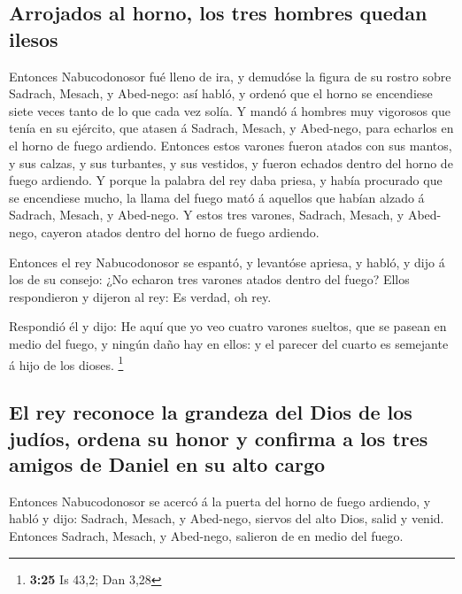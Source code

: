 \hypertarget{arrojados-al-horno-los-tres-hombres-quedan-ilesos}{%
\subsection{Arrojados al horno, los tres hombres quedan
ilesos}\label{arrojados-al-horno-los-tres-hombres-quedan-ilesos}}

 Entonces Nabucodonosor fué lleno de ira, y demudóse la
figura de su rostro sobre Sadrach, Mesach, y Abed-nego: así habló, y
ordenó que el horno se encendiese siete veces tanto de lo que cada vez
solía.  Y mandó á hombres muy vigorosos que tenía en su
ejército, que atasen á Sadrach, Mesach, y Abed-nego, para echarlos en el
horno de fuego ardiendo.  Entonces estos varones fueron
atados con sus mantos, y sus calzas, y sus turbantes, y sus vestidos, y
fueron echados dentro del horno de fuego ardiendo.  Y
porque la palabra del rey daba priesa, y había procurado que se
encendiese mucho, la llama del fuego mató á aquellos que habían alzado á
Sadrach, Mesach, y Abed-nego.  Y estos tres varones,
Sadrach, Mesach, y Abed-nego, cayeron atados dentro del horno de fuego
ardiendo.

 Entonces el rey Nabucodonosor se espantó, y levantóse
apriesa, y habló, y dijo á los de su consejo: ¿No echaron tres varones
atados dentro del fuego? Ellos respondieron y dijeron al rey: Es verdad,
oh rey.

 Respondió él y dijo: He aquí que yo veo cuatro varones
sueltos, que se pasean en medio del fuego, y ningún daño hay en ellos: y
el parecer del cuarto es semejante á hijo de los dioses. \footnote{\textbf{3:25}
  Is 43,2; Dan 3,28}

\hypertarget{el-rey-reconoce-la-grandeza-del-dios-de-los-juduxedos-ordena-su-honor-y-confirma-a-los-tres-amigos-de-daniel-en-su-alto-cargo}{%
\subsection{El rey reconoce la grandeza del Dios de los judíos, ordena
su honor y confirma a los tres amigos de Daniel en su alto
cargo}\label{el-rey-reconoce-la-grandeza-del-dios-de-los-juduxedos-ordena-su-honor-y-confirma-a-los-tres-amigos-de-daniel-en-su-alto-cargo}}

 Entonces Nabucodonosor se acercó á la puerta del horno de
fuego ardiendo, y habló y dijo: Sadrach, Mesach, y Abed-nego, siervos
del alto Dios, salid y venid. Entonces Sadrach, Mesach, y Abed-nego,
salieron de en medio del fuego.

